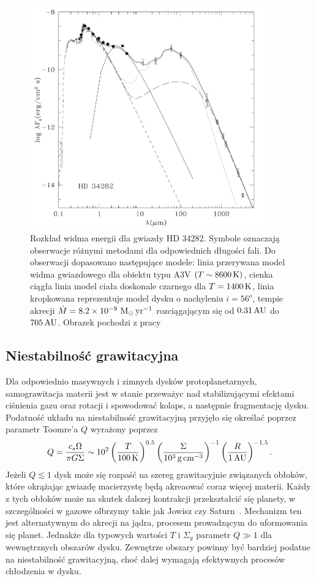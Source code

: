 \begin{figure}
   \includegraphics[width=0.9\textwidth]{figures/chap1_sed.png}
   \caption{Rozkład widma energii dla gwiazdy HD 34282. Symbole oznaczają
      obserwacje różnymi metodami dla odpowiednich długości fali. Do obserwacji
      dopasowano następujące modele: linia przerywana model widma gwiazdowego
      dla obiektu typu A3V $(T\sim 8600\hbox{$\thinspace\textrm{K}$})$, cienka ciągła
      linia model ciała doskonale czarnego dla $T=1400\hbox{$\thinspace\textrm{K}$}$,
      linia kropkowana reprezentuje model dysku o nachyleniu $i=56^o$, tempie
      akrecji $\dot{M} = 8.2\times10^{-9}\thinspace\hbox{$\mathrm{\thinspace M_{\odot}}$}\hbox{$\thinspace\textrm{yr}$}^{-1}$
      rozciągającym się od $0.31\hbox{$\thinspace\textrm{AU}$}$ do $705\hbox{$\thinspace\textrm{AU}$}$.
   Obrazek pochodzi z pracy~\cite{0402599}}
\end{figure}

\subsection{Niestabilność grawitacyjna}
Dla odpowiednio masywnych i zimnych dysków protoplanetarnych, samograwitacja
materii jest w stanie przeważyc nad stabilizującymi efektami ciśnienia gazu oraz
rotacji i spowodować kolaps, a następnie fragmentację dysku. Podatność układu na
niestabilność grawitacyjną przyjęło się określać poprzez parametr Toomre'a $Q$
wyrażony poprzez
\begin{equation}
   Q = \frac{c_s\Omega}{\pi G \Sigma} \sim 10^2 
   \left(\frac{T}{100\hbox{$\thinspace\textrm{K}$}}\right)^{0.5}
   \left(\frac{\Sigma}{10^3\hbox{$\thinspace\textrm{g}$}\hbox{$\thinspace\textrm{cm}$}^{-3}}\right)^{-1}
   \left(\frac{R}{1\hbox{$\thinspace\textrm{AU}$}}\right)^{-1.5}.
\end{equation}
Jeżeli $Q\lesssim1$ dysk może się rozpaść na szereg grawitacyjnie związanych
obłoków, które okrążając gwiazdę macierzystę będą akreaować coraz więcej
materii. Każdy z tych obłoków może na skutek dalszej kontrakcji przekształcić
się planety, w szczególności w gazowe olbrzymy takie jak Jowisz czy
Saturn~\cite{Boss2000}. Mechanizm ten jest alternatywnym do akrecji na jądra,
procesem prowadzącym do uformowania się planet. Jednakże dla typowych wartości
$T$ i $\Sigma_g$ parametr $Q\gg 1$ dla wewnętrznych obszarów dysku. Zewnętrze
obszary powinny być bardziej podatne na niestabilność grawitacyjną, choć dalej
wymagają efektywnych procesów chłodzenia w dysku. 

